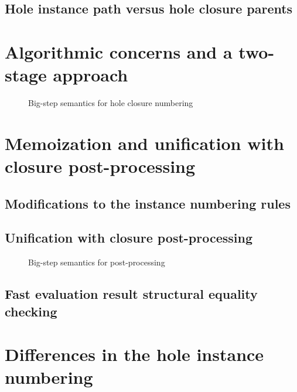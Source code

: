 \subsection{Hole instance path versus hole closure parents}
\label{sec:closure-parents}



\section{Algorithmic concerns and a two-stage approach}
\label{sec:two-stage-renumber}

\begin{figure}
  \centering
  \begin{mdframed}
    \begin{singlespace}
      
    \end{singlespace}
  \end{mdframed}
  \caption{Big-step semantics for hole closure numbering}
  \label{fig:big-step-renumber-new-rules}
\end{figure}


\section{Memoization and unification with closure post-processing}
\label{sec:renumbering_memoization}

\subsection{Modifications to the instance numbering rules}
\label{sec:memoization-instance-numbering}

\subsection{Unification with closure post-processing}
\label{sec:unification-postprocessing}

\begin{figure}
  \centering
  \begin{mdframed}
    \begin{singlespace}
      
    \end{singlespace}
  \end{mdframed}
  \caption{Big-step semantics for post-processing}
  \label{fig:big-step-postprocessing-rules}
\end{figure}

\subsection{Fast evaluation result structural equality checking}
\label{sec:fast-equals}

\section{Differences in the hole instance numbering}
\label{sec:differences_numbering}


